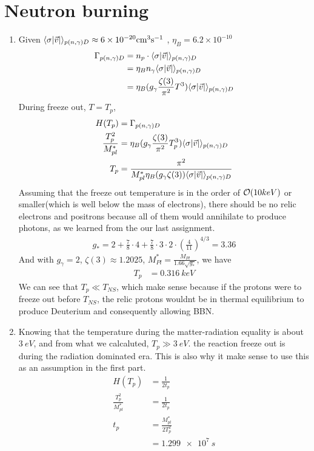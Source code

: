 \section{Neutron burning}
\begin{enumerate}[label=\alph*)]
\item Given $\langle\sigma \abs{\vec{v}} \rangle_{p(n,\gamma)D} \approx 6\times\SI{}{10^{-20} cm^3 s^{-1}}$ , $\eta_B = 6.2 \times 10^{-10}$
\begin{align}
\Gamma_{p(n,\gamma)D} &= n_p \cdot \langle\sigma \abs{\vec{v}} \rangle_{p(n,\gamma)D} \\
	&= \eta_B n_\gamma  \langle\sigma \abs{\vec{v}} \rangle_{p(n,\gamma)D} \nonumber \\ 
	&= \eta_B (g_\gamma \frac{\zeta(3)}{\pi^2}T^3)\langle\sigma \abs{\vec{v}} \rangle_{p(n,\gamma)D} \nonumber
\end{align}
During freeze out, $T = T_p$,
\begin{align}
H(T_p) &= \Gamma_{p(n,\gamma)D}  \\
\frac{T_p^2}{M^{\ast}_{pl}}  &= \eta_B (g_\gamma \frac{\zeta(3)}{\pi^2}T_p^3)\langle\sigma \abs{\vec{v}} \rangle_{p(n,\gamma)D} \nonumber \\
T_p &= \frac{\pi^2}{M^{\ast}_{pl} \eta_B (g_\gamma \zeta(3))\langle\sigma \abs{\vec{v}} \rangle_{p(n,\gamma)D}}
\end{align}
Assuming that the freeze out temperature is in the order of $\order{10keV}$ or smaller(which is well below the mass of electrons), there should be no relic electrons and positrons because all of them would annihilate to produce photons, as we learned from the our last assignment.
\begin{align}
g_* = 2 + \frac{7}{8} \cdot 4 +\frac{7}{8} \cdot 3 \cdot 2 \cdot \left( \frac{4}{11} \right)^{4/3} = 3.36
\end{align}
And with $g_\gamma = 2$, $\zeta(3) \approx 1.2025$, $M^{\ast}_{Pl} =\frac{M_{Pl}}{1.66\sqrt{g_*}}$, we have
\begin{align}
T_p &= \SI{0.316}{keV}
\end{align}
We can see that $T_p \ll T_{NS}$, which make sense because if the protons were to freeze out before $T_{NS}$, the relic protons wouldnt be in thermal equilibrium to produce Deuterium and consequently allowing BBN.

\item Knowing that the temperature during the matter-radiation equality is about $\SI{3}{eV}$, and from what we calcaluted, $T_p \gg \SI{3}{eV}$. the reaction freeze out is during the radiation dominated era. This is also why it make sense to use this as an assumption in the first part. 
\begin{align}
H(T_p) 	&= \frac{1}{2t_p} \\
\frac{T_p^2}{M^{\ast}_{pl}} &= \frac{1}{2t_p} \nonumber  \\
t_p &= \frac{M^{\ast}_{pl}} {2T_p^2}  \nonumber  \\
	&= \SI{1.299e7}{s}\nonumber  
\end{align}
\end{enumerate}

